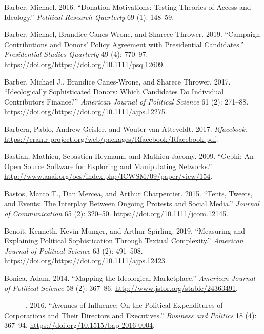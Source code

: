 \documentclass[12pt,]{article}
\begin{document}
\leavevmode\hypertarget{ref-barber2016a}{}%
Barber, Michael. 2016. ``Donation Motivations: Testing Theories of
Access and Ideology.'' \emph{Political Research Quarterly} 69 (1):
148--59.

\leavevmode\hypertarget{ref-barber2019}{}%
Barber, Michael, Brandice Canes-Wrone, and Sharece Thrower. 2019.
``Campaign Contributions and Donors' Policy Agreement with Presidential
Candidates.'' \emph{Presidential Studies Quarterly} 49 (4): 770--97.
\url{https://doi.org/https://doi.org/10.1111/psq.12609}.

\leavevmode\hypertarget{ref-barber2017}{}%
Barber, Michael J., Brandice Canes-Wrone, and Sharece Thrower. 2017.
``Ideologically Sophisticated Donors: Which Candidates Do Individual
Contributors Finance?'' \emph{American Journal of Political Science} 61
(2): 271--88. \url{https://doi.org/https://doi.org/10.1111/ajps.12275}.

\leavevmode\hypertarget{ref-rfacebook}{}%
Barbera, Pablo, Andrew Geisler, and Wouter van Atteveldt. 2017.
\emph{Rfacebook}.
\url{https://cran.r-project.org/web/packages/Rfacebook/Rfacebook.pdf}.

\leavevmode\hypertarget{ref-gephi}{}%
Bastian, Mathieu, Sebastien Heymann, and Mathieu Jacomy. 2009. ``Gephi:
An Open Source Software for Exploring and Manipulating Networks.''
\url{http://www.aaai.org/ocs/index.php/ICWSM/09/paper/view/154}.

\leavevmode\hypertarget{ref-bastos2015}{}%
Bastos, Marco T., Dan Mercea, and Arthur Charpentier. 2015. ``Tents,
Tweets, and Events: The Interplay Between Ongoing Protests and Social
Media.'' \emph{Journal of Communication} 65 (2): 320--50.
\url{https://doi.org/10.1111/jcom.12145}.

\leavevmode\hypertarget{ref-benoit2019}{}%
Benoit, Kenneth, Kevin Munger, and Arthur Spirling. 2019. ``Measuring
and Explaining Political Sophistication Through Textual Complexity.''
\emph{American Journal of Political Science} 63 (2): 491--508.
\url{https://doi.org/https://doi.org/10.1111/ajps.12423}.

\leavevmode\hypertarget{ref-bonica2014}{}%
Bonica, Adam. 2014. ``Mapping the Ideological Marketplace.''
\emph{American Journal of Political Science} 58 (2): 367--86.
\url{http://www.jstor.org/stable/24363491}.

\leavevmode\hypertarget{ref-bonica2016}{}%
---------. 2016. ``Avenues of Influence: On the Political Expenditures
of Corporations and Their Directors and Executives.'' \emph{Business and
Politics} 18 (4): 367--94. \url{https://doi.org/10.1515/bap-2016-0004}.
\end{document}
